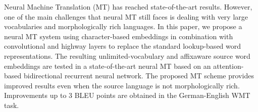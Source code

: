 Neural Machine Translation (MT) has reached state-of-the-art results. However, one of the main challenges that neural MT still faces is dealing with very large vocabularies and morphologically rich languages. In this paper, we propose a neural MT system using character-based embeddings in combination with convolutional and highway layers to replace the standard lookup-based word representations. The resulting unlimited-vocabulary and affixaware source word embeddings are tested in a state-of-the-art neural MT based on an attention-based bidirectional recurrent neural network. The proposed MT scheme provides improved results even when the source language is not morphologically rich. Improvements up to 3 BLEU points are obtained in the German-English WMT task.
